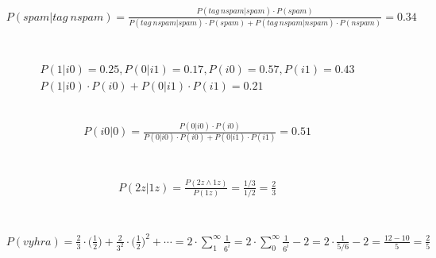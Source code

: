 \documentclass[a4paper]{article}
\begin{document}
\subsection{}
\begin{align*}
& P(spam|tag\ nspam) = \frac{P(tag\ nspam|spam)\cdot P(spam)}{P(tag\ nspam|spam)\cdot P(spam)+P(tag\ nspam|nspam)\cdot P(nspam)} = 0.34
\end{align*}

\section{}
\subsection{}
\begin{align*}
& P(1 | i0) = 0.25, P(0 | i1) = 0.17, P(i0) = 0.57, P(i1) = 0.43 \\
& P(1 | i0) \cdot P(i0) + P(0 | i1) \cdot P(i1) = 0.21
\end{align*}

\subsection{}
\begin{align*}
& P(i0 | 0) = \frac{P(0|i0) \cdot P(i0) }{P(0|i0) \cdot P(i0) + P(0|i1) \cdot P(i1)} = 0.51
\end{align*}

\section{}
\begin{align*}
& P(2z|1z) = \frac{P(2z \wedge 1z)}{P(1z)} = \frac{1/3}{1/2} = \frac{2}{3}
\end{align*}

\section{}
\subsection{}
\begin{align*}
& P(vyhra) = \frac{2}{3} \cdot \big(\frac{1}{2}\big) + \frac{2}{3^2} \cdot \big(\frac{1}{2}\big)^2 + \cdots = 2 \cdot \sum_1^\infty \frac{1}{6^i} = 2 \cdot \sum_0^\infty \frac{1}{6^i} - 2 = 2 \cdot \frac{1}{5/6} -2 = \frac{12-10}{5} = \frac{2}{5}
\end{align*}
\end{document}
